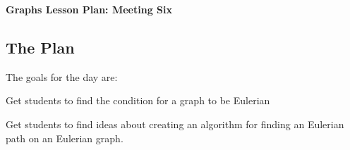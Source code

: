 \documentclass[12pt]{amsart}
\theoremstyle{definition}
\begin{document}
\begin{center}
\textbf{\Huge
Graphs Lesson Plan: Meeting Six
}
\end{center}
\vspace{.5in}


\subsection*{The Plan}

The goals for the day are:
\begin{compactitem}
\item Get students to find the condition for a graph to be Eulerian
\item Get students to find ideas about creating an algorithm for finding an Eulerian path on an Eulerian graph.
\end{compactitem}
\end{document}

